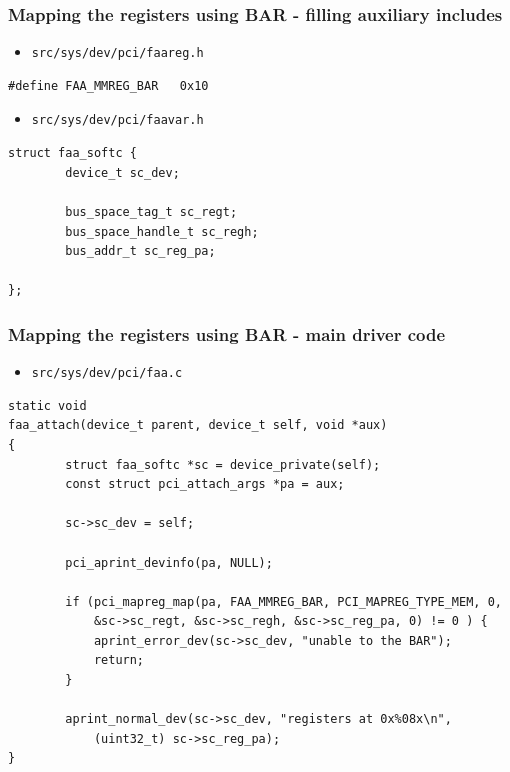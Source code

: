 \documentclass[dvipsnames,table]{beamer}
\begin{document}
\begin{frame}[fragile]
\frametitle{Mapping the registers using BAR - filling auxiliary includes}
\scriptsize
\begin{itemize}
	\item {\tt src/sys/dev/pci/faareg.h}
\end{itemize}
\begin{verbatim}
#define FAA_MMREG_BAR   0x10
\end{verbatim}
\begin{itemize}
	\item {\tt src/sys/dev/pci/faavar.h}
\end{itemize}
\begin{verbatim}
struct faa_softc {
        device_t sc_dev;

        bus_space_tag_t sc_regt;
        bus_space_handle_t sc_regh;
        bus_addr_t sc_reg_pa;

};
\end{verbatim}
\end{frame}

\begin{frame}[fragile]
\frametitle{Mapping the registers using BAR - main driver code}
\scriptsize
\begin{itemize}
	\item {\tt src/sys/dev/pci/faa.c}
\end{itemize}
\begin{verbatim}
static void
faa_attach(device_t parent, device_t self, void *aux)
{
        struct faa_softc *sc = device_private(self);
        const struct pci_attach_args *pa = aux;

        sc->sc_dev = self;

        pci_aprint_devinfo(pa, NULL);

        if (pci_mapreg_map(pa, FAA_MMREG_BAR, PCI_MAPREG_TYPE_MEM, 0,
            &sc->sc_regt, &sc->sc_regh, &sc->sc_reg_pa, 0) != 0 ) {
            aprint_error_dev(sc->sc_dev, "unable to the BAR");
            return;
        }

        aprint_normal_dev(sc->sc_dev, "registers at 0x%08x\n",
            (uint32_t) sc->sc_reg_pa);
}
\end{verbatim}
\end{frame}




\end{document}
